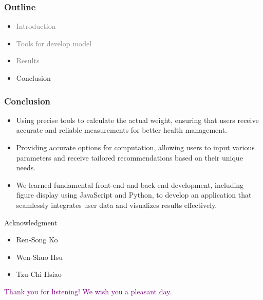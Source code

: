 \documentclass[fleqn]{beamer}
\begin{document}
\begin{frame}
\frametitle{Outline}
\begin{itemize}
\item \textcolor{gray}{Introduction} \\
\item \textcolor{gray}{Tools for develop model} \\
\item \textcolor{gray}{Results} \\
\item Conclusion
\end{itemize}
\end{frame}
\begin{frame}
\frametitle{Conclusion}
\begin{itemize}
\item Using precise tools to calculate the actual weight, ensuring that users receive accurate and reliable measurements for better health management. \\
\pause
\item Providing accurate options for computation, allowing users to input various parameters and receive tailored recommendations based on their unique needs. \\
\pause
\item We learned fundamental front-end and back-end development, including figure display using JavaScript and Python, to develop an application that seamlessly integrates user data and visualizes results effectively.
\end{itemize}
\end{frame}
\begin{frame}{Acknowledgment}
\begin{block}{}
\normalsize
{}
\begin{itemize}
\item Ren-Song Ko
\item Wen-Shuo Hsu
\item Tzu-Chi Hsiao
\end{itemize}
\end{block}
\vspace{1em}
\begin{block}{}
\normalsize
{}
\begin{center}
\textcolor{purple}{Thank you for listening! We wish you a pleasant day.}
\end{center}
\end{block}
\end{frame}
\end{document}
